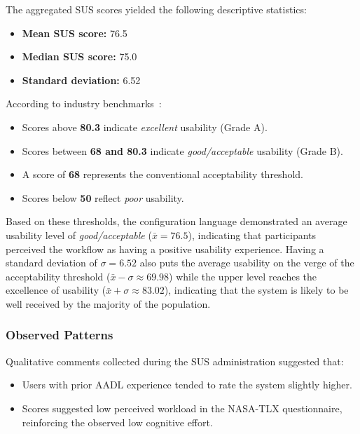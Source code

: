 The aggregated \gls{SUS} scores yielded the following descriptive statistics:

\begin{itemize}
	\item \textbf{Mean \gls{SUS} score:} 76.5
	\item \textbf{Median \gls{SUS} score:} 75.0
	\item \textbf{Standard deviation:} 6.52
\end{itemize}

According to industry benchmarks~\cite{Bangor2009,SauroLewis2016}:

\begin{itemize}
	\item Scores above \textbf{80.3} indicate \emph{excellent} usability (Grade A).
	\item Scores between \textbf{68 and 80.3} indicate \emph{good/acceptable} usability (Grade B).
	\item A score of \textbf{68} represents the conventional acceptability threshold.
	\item Scores below \textbf{50} reflect \emph{poor} usability.
\end{itemize}

Based on these thresholds, the configuration language demonstrated an average usability level of \emph{good/acceptable} ($\bar{x} = 76.5$), indicating that participants perceived the workflow as having a positive usability experience. Having a standard deviation of $\sigma = 6.52$ also puts the average usability on the verge of the acceptability threshold ($\bar{x} - \sigma \approx 69.98$) while the upper level reaches the excellence of usability ($\bar{x} + \sigma \approx 83.02$), indicating that the system is likely to be well received by the majority of the population.

\subsubsection{Observed Patterns}
\label{sec:test_usabl_obs_patterns}

Qualitative comments collected during the \gls{SUS} administration suggested that:

\begin{itemize}
	\item Users with prior \gls{AADL} experience tended to rate the system slightly higher.
	\item Scores suggested low perceived workload in the NASA-\gls{TLX} questionnaire, reinforcing the observed low cognitive effort.
\end{itemize}



